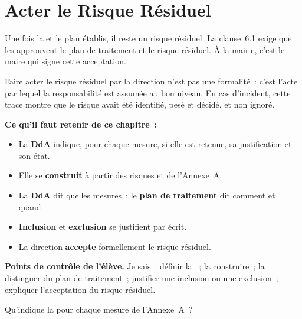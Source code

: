 \section{Acter le Risque Résiduel}
\label{sec:c14-acter}

Une fois la  et le plan établis, il reste un risque résiduel. La
clause~6.1 exige que les  approuvent le plan
de traitement et  le risque résiduel. À la mairie, c'est le
maire qui signe cette acceptation.

\begin{boxjuris}
Faire acter le risque résiduel par la direction n'est pas une formalité~: c'est
l'acte par lequel la responsabilité est assumée au bon niveau. En cas
d'incident, cette trace montre que le risque avait été identifié, pesé et
décidé, et non ignoré.
\end{boxjuris}

\separateur

\begin{boxresume}
\textbf{Ce qu'il faut retenir de ce chapitre~:}
\begin{itemize}
    \item La \textbf{DdA} indique, pour chaque mesure, si elle est retenue, sa
          justification et son état.
    \item Elle se \textbf{construit} à partir des risques et de l'Annexe~A.
    \item La \textbf{DdA} dit quelles mesures~; le \textbf{plan de traitement}
          dit comment et quand.
    \item \textbf{Inclusion} et \textbf{exclusion} se justifient par écrit.
    \item La direction \textbf{accepte} formellement le risque résiduel.
\end{itemize}
\end{boxresume}

\begin{boxinfo}
\textbf{Points de contrôle de l'élève.} Je sais~: définir la ~; la
construire~; la distinguer du plan de traitement~; justifier une inclusion ou
une exclusion~; expliquer l'acceptation du risque résiduel.
\end{boxinfo}

\bigskip

\begin{boxexo}[title={\ding{45}\quad Exercice~14.1. Rôle de la DdA \niveaubase}]
Qu'indique la  pour chaque mesure de l'Annexe~A~?
\end{boxexo}

